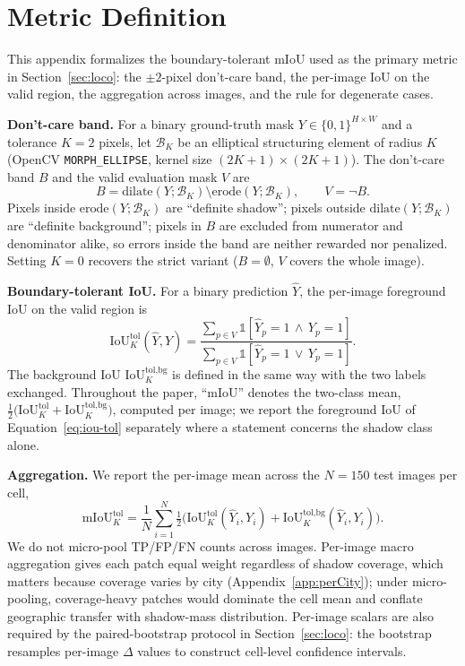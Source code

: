 \section{Metric Definition}
\label{app:metric}

This appendix formalizes the boundary-tolerant mIoU used as the primary
metric in Section~\ref{sec:loco}: the $\pm 2$-pixel don't-care band, the
per-image IoU on the valid region, the aggregation across images, and the
rule for degenerate cases.

\textbf{Don't-care band.}
For a binary ground-truth mask $Y \in \{0,1\}^{H \times W}$ and a tolerance
$K = 2$ pixels, let $\mathcal{B}_K$ be an elliptical structuring element of
radius $K$ (OpenCV \texttt{MORPH\_ELLIPSE}, kernel size
$(2K+1) \times (2K+1)$). The don't-care band $B$ and the valid evaluation
mask $V$ are
\begin{equation}
B = \text{dilate}(Y; \mathcal{B}_K) \setminus \text{erode}(Y; \mathcal{B}_K),
\qquad
V = \neg B.
\label{eq:band}
\end{equation}
Pixels inside $\text{erode}(Y; \mathcal{B}_K)$ are ``definite shadow''; pixels
outside $\text{dilate}(Y; \mathcal{B}_K)$ are ``definite background''; pixels
in $B$ are excluded from numerator and denominator alike, so errors inside
the band are neither rewarded nor penalized. Setting $K = 0$ recovers the
strict variant ($B = \emptyset$, $V$ covers the whole image).

\textbf{Boundary-tolerant IoU.}
For a binary prediction $\hat{Y}$, the per-image foreground IoU on the valid
region is
\begin{equation}
\text{IoU}^{\text{tol}}_K(\hat{Y}, Y) =
\frac{\sum_{p \in V} \mathbb{1}\!\left[\hat{Y}_p = 1 \,\wedge\, Y_p = 1\right]}
     {\sum_{p \in V} \mathbb{1}\!\left[\hat{Y}_p = 1 \,\vee\, Y_p = 1\right]}.
\label{eq:iou-tol}
\end{equation}
The background IoU $\text{IoU}^{\text{tol,bg}}_K$ is defined in the same way with the two
labels exchanged. Throughout the paper, ``mIoU'' denotes the two-class mean,
$\tfrac{1}{2}\big(\text{IoU}^{\text{tol}}_K + \text{IoU}^{\text{tol,bg}}_K\big)$, computed per
image; we report the foreground IoU of Equation~\ref{eq:iou-tol} separately where a statement
concerns the shadow class alone.

\textbf{Aggregation.}
We report the per-image mean across the $N = 150$ test images per cell,
\begin{equation}
\text{mIoU}^{\text{tol}}_K = \frac{1}{N} \sum_{i=1}^{N}
\tfrac{1}{2}\Big(\text{IoU}^{\text{tol}}_K(\hat{Y}_i, Y_i) + \text{IoU}^{\text{tol,bg}}_K(\hat{Y}_i, Y_i)\Big).
\label{eq:miou}
\end{equation}
We do not micro-pool TP/FP/FN counts across images. Per-image macro
aggregation gives each patch equal weight regardless of shadow coverage,
which matters because coverage varies by city (Appendix~\ref{app:perCity});
under micro-pooling, coverage-heavy patches would dominate the cell mean and
conflate geographic transfer with shadow-mass distribution. Per-image
scalars are also required by the paired-bootstrap protocol in
Section~\ref{sec:loco}: the bootstrap resamples per-image $\Delta$ values to
construct cell-level confidence intervals.

